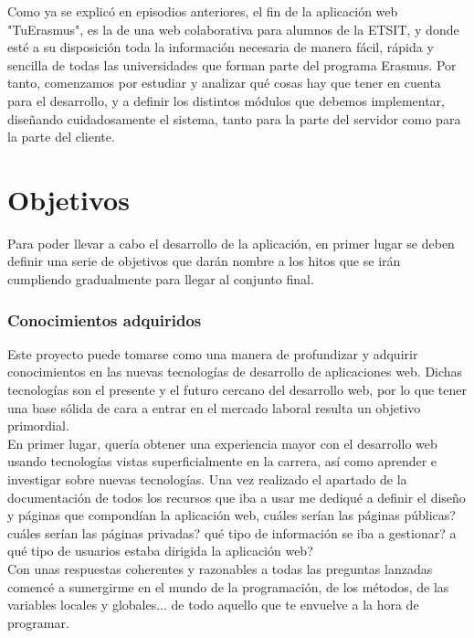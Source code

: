 Como ya se explic\'o en episodios anteriores, el fin de la aplicaci\'on web "TuErasmus", es la de una web colaborativa para alumnos de la ETSIT, y donde est\'e a su disposici\'on toda la informaci\'on necesaria de manera f\'acil, r\'apida y sencilla de todas las universidades que forman parte del programa Erasmus. Por tanto, comenzamos por estudiar y analizar qu\'e cosas hay que tener en cuenta para el desarrollo, y a definir los distintos m\'odulos que debemos implementar, dise\~nando cuidadosamente el sistema, tanto para la parte del servidor como para la parte del cliente.\\  

\section{Objetivos}
Para poder llevar a cabo el desarrollo de la aplicaci\'on, en primer lugar se deben definir una serie de objetivos que dar\'an nombre a los hitos que se ir\'an cumpliendo gradualmente para llegar al conjunto final.\\

\subsubsection{Conocimientos adquiridos}
Este proyecto puede tomarse como una manera de profundizar y adquirir conocimientos en las nuevas tecnolog\'ias de desarrollo de aplicaciones web. Dichas tecnolog\'ias son el presente y el futuro cercano del desarrollo web, por lo que tener una base s\'olida de cara a entrar en el mercado laboral resulta un objetivo primordial.\\

En primer lugar, quer\'ia obtener una experiencia mayor con el desarrollo web usando tecnolog\'ias vistas superficialmente en la carrera, as\'i como aprender e investigar sobre nuevas tecnolog\'ias. Una vez realizado el apartado de la documentaci\'on de todos los recursos que iba a usar me dediqu\'e a definir el dise\~no y p\'aginas que compond\'ian la aplicaci\'on web, \¿cu\'ales ser\'ian las p\'aginas p\'ublicas? \¿cu\'ales ser\'ian las p\'aginas privadas? \¿qu\'e tipo de informaci\'on se iba a gestionar? \¿a qu\'e tipo de usuarios estaba dirigida la aplicaci\'on web?\\

Con unas respuestas coherentes y razonables a todas las preguntas lanzadas comenc\'e a sumergirme en el mundo de la programaci\'on, de los m\'etodos, de las variables locales y globales... de todo aquello que te envuelve a la hora de programar.\\

